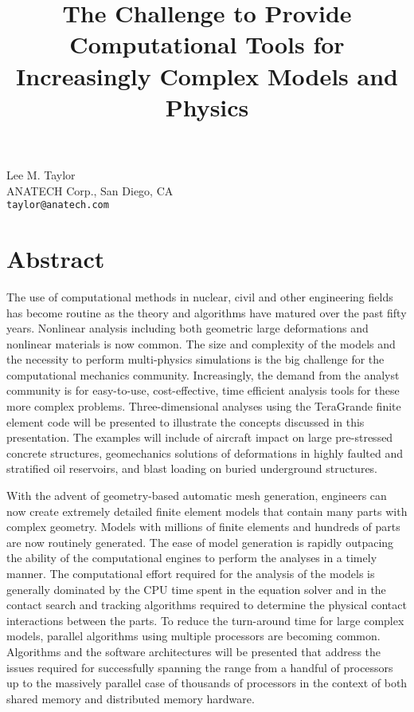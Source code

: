 \title{The Challenge to Provide Computational Tools for Increasingly Complex Models and Physics}
\author{} \institute{}
\maketitle

\begin{center}
{\large Lee M. Taylor}\\
ANATECH Corp., San Diego, CA\\
{\tt taylor@anatech.com}
\end{center}

\section*{Abstract}
The use of computational methods in nuclear, civil and other engineering fields has become routine as the theory and algorithms have matured over the past fifty years. Nonlinear analysis including both geometric large deformations and nonlinear materials is now common. The size and complexity of the models and the necessity to perform multi-physics simulations is the big challenge for the computational mechanics community. Increasingly, the demand from the analyst community is for easy-to-use, cost-effective, time efficient analysis tools for these more complex problems. Three-dimensional analyses using the TeraGrande finite element code \cite{TG} will be presented to illustrate the concepts discussed in this presentation. The examples will include of aircraft impact on large pre-stressed concrete structures\cite{ras}, geomechanics solutions of deformations in highly faulted and stratified oil reservoirs, and blast loading on buried underground structures.

With the advent of geometry-based automatic mesh generation, engineers can now create extremely detailed finite element models that contain many parts with complex geometry. Models with millions of finite elements and hundreds of parts are now routinely generated. The ease of model generation is rapidly outpacing the ability of the computational engines to perform the analyses in a timely manner. The computational effort required for the analysis of the models is generally dominated by the CPU time spent in the equation solver and in the contact search and tracking algorithms required to determine the physical contact interactions between the parts. To reduce the turn-around time for large complex models, parallel algorithms using multiple processors are becoming common. Algorithms and the software architectures will be presented that address the issues required for successfully spanning the range from a handful of processors up to the massively parallel case of thousands of
processors in the context of both shared memory and distributed memory hardware.

